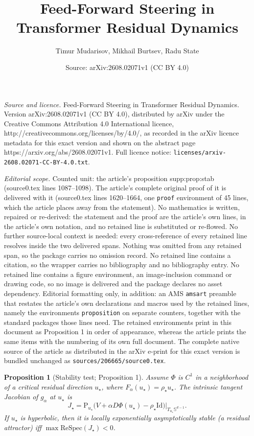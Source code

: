 \documentclass[10pt,a4paper]{amsart}
\title{Feed-Forward Steering in Transformer Residual Dynamics}
\author{Timur Mudarisov, Mikhail Burtsev, Radu State}
\date{Source: arXiv:2608.02071v1 (CC BY 4.0)}
\newtheorem{proposition}{Proposition}
\newcommand{\Proj}{\mathrm{P}}
\newcommand{\RePart}{\mathrm{Re}}
\newcommand{\Spec}{\mathrm{Spec}}
\newcommand{\Sph}{\mathbb{S}}
\newcommand{\id}{\mathrm{Id}}
\begin{document}
\maketitle

\noindent\emph{Source and licence.} Feed-Forward Steering in Transformer Residual Dynamics. Version arXiv:2608.02071v1 (CC BY 4.0), distributed by arXiv under the Creative Commons Attribution 4.0 International licence, http://creativecommons.org/licenses/by/4.0/, as recorded in the arXiv licence metadata for this exact version and shown on the abstract page https://arxiv.org/abs/2608.02071v1. Full licence notice: \texttt{licenses/arxiv-2608.02071-CC-BY-4.0.txt}.\par\smallskip

\noindent\textit{Editorial scope.} Counted unit: the article's proposition supp:prop:stab (source0.tex lines 1087--1098). The article's complete original proof of it is delivered with it (source0.tex lines 1620--1664, one \texttt{proof} environment of 45 lines, which the article places away from the statement). No mathematics is written, repaired or re-derived: the statement and the proof are the article's own lines, in the article's own notation, and no retained line is substituted or re-flowed.  No further source-local context is needed: every cross-reference of every retained line resolves inside the two delivered spans.  Nothing was omitted from any retained span, so the package carries no omission record.  No retained line contains a citation, so the wrapper carries no bibliography and no bibliography entry.  No retained line contains a figure environment, an image-inclusion command or drawing code, so no image is delivered and the package declares no asset dependency.  Editorial formatting only, in addition: an AMS \texttt{amsart} preamble that restates the article's own declarations and macros used by the retained lines, namely the environments \texttt{proposition} on separate counters, together with the standard packages those lines need.  The retained environments print in this document as Proposition 1 in order of appearance, whereas the article prints the same items with the numbering of its own full document.  The complete native source of the article as distributed in the arXiv e-print for this exact version is bundled unchanged as \texttt{sources/206665/source0.tex}.
\begin{proposition}[Stability test; Proposition 1]\label{supp:prop:stab}
Assume $\Phi$ is $C^1$ in a neighborhood of a critical residual direction
$u_\star$, where $F_\alpha(u_\star)=\rho_\star u_\star$. The intrinsic tangent
Jacobian of $g_\alpha$ at $u_\star$ is
\begin{equation}
J_\star=\Proj_{u_\star}\big(V+\alpha D\Phi(u_\star)-\rho_\star\id\big)
\big|_{T_{u_\star}\Sph^{d-1}}.
\label{supp:eq:jac}
\end{equation}
If $u_\star$ is hyperbolic, then it is locally exponentially asymptotically
stable (a residual attractor) iff $\max\RePart\Spec(J_\star)<0$.
\end{proposition}
\end{document}
